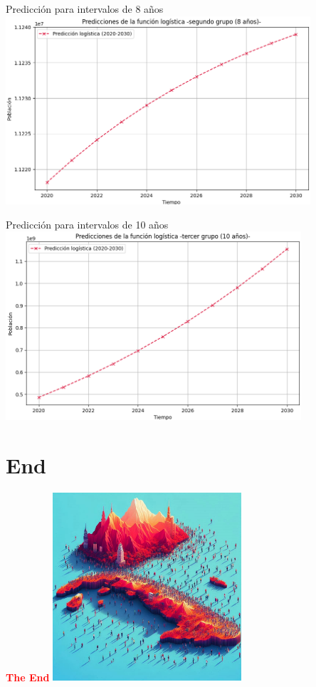\documentclass{beamer}
\begin{document}
\begin{frame}{Predicción para intervalos de 8 años}
    \includegraphics[height = 7cm]{img/graph_img/pred8.png}
\end{frame}

\begin{frame}{Predicción para intervalos de 10 años}
    \includegraphics[height = 7cm]{img/graph_img/pred10.png}
\end{frame}

\section{End}
\begin{frame}
    \huge{\textbf{\textcolor{red}{The End}}}
    \includegraphics[height = 7cm]{img/cuba3.jpeg}
\end{frame}
\end{document}
